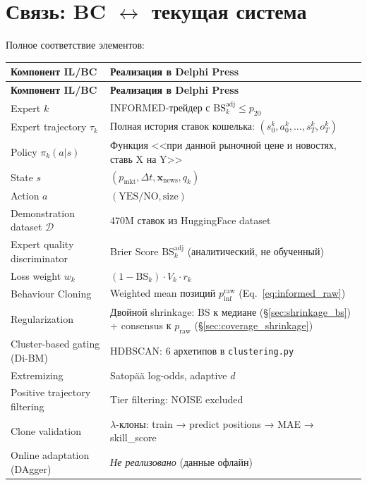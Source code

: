 \documentclass[a4paper, 11pt]{article}
\newcommand{\bs}{\mathrm{BS}}
\begin{document}
\section{Связь: BC $\leftrightarrow$ текущая система}
\label{sec:bridge}

Полное соответствие элементов:

\begin{longtable}{p{5.5cm}p{8cm}}
\toprule
\textbf{Компонент IL/BC} & \textbf{Реализация в Delphi Press} \\
\midrule
\endfirsthead
\midrule
\textbf{Компонент IL/BC} & \textbf{Реализация в Delphi Press} \\
\midrule
\endhead
Expert $k$ & INFORMED-трейдер с $\bs_k^{\mathrm{adj}} \leq p_{20}$ \\[3pt]
Expert trajectory $\tau_k$ & Полная история ставок кошелька: $(s_0^k, a_0^k, \ldots, s_T^k, o_T^k)$ \\[3pt]
Policy $\pi_k(a|s)$ & Функция <<при данной рыночной цене и новостях, ставь X на Y>> \\[3pt]
State $s$ & $(p_{\mathrm{mkt}}, \Delta t, \mathbf{x}_{\mathrm{news}}, q_k)$ \\[3pt]
Action $a$ & $(\text{YES/NO}, \text{size})$ \\[3pt]
Demonstration dataset $\mathcal{D}$ & 470M ставок из HuggingFace dataset \\[3pt]
Expert quality discriminator & Brier Score $\bs_k^{\mathrm{adj}}$ (аналитический, не обученный) \\[3pt]
Loss weight $w_k$ & $(1 - \bs_k) \cdot V_k \cdot r_k$ \\[3pt]
Behaviour Cloning & Weighted mean позиций $p_{\mathrm{inf}}^{\mathrm{raw}}$ (Eq.~\ref{eq:informed_raw}) \\[3pt]
Regularization & Двойной shrinkage: BS к медиане (\S\ref{sec:shrinkage_bs}) + consensus к $p_{\mathrm{raw}}$ (\S\ref{sec:coverage_shrinkage}) \\[3pt]
Cluster-based gating (Di-BM) & HDBSCAN: 6 архетипов в \texttt{clustering.py} \\[3pt]
Extremizing & Satop\"a\"a log-odds, adaptive $d$ \\[3pt]
Positive trajectory filtering & Tier filtering: NOISE excluded \\[3pt]
Clone validation & $\lambda$-клоны: train → predict positions → MAE → skill\_score \\[3pt]
Online adaptation (DAgger) & \emph{Не реализовано} (данные офлайн) \\
\bottomrule
\end{longtable}
\end{document}
